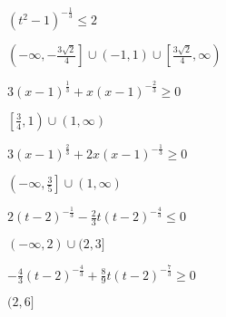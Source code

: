 \documentclass{ximera}
\begin{document}
\begin{question}
$(t^2-1)^{-\frac{1}{3}} \leq 2$  %

\begin{solution}
$\left(-\infty, -\frac{3\sqrt{2}}{4} \right] \cup (-1,1) \cup \left[ \frac{3\sqrt{2}}{4}, \infty \right)$

\end{solution}

\end{question}

\begin{question}
$3(x-1)^{\frac{1}{3}} +x (x-1)^{-\frac{2}{3}} \geq 0$ %
\begin{solution}
$\left[ \frac{3}{4}, 1\right) \cup (1, \infty)$
\end{solution}

\end{question}

\begin{question}
$3(x-1)^{\frac{2}{3}} +2x (x-1)^{-\frac{1}{3}} \geq 0$ %

\begin{solution}
$\left( -\infty, \frac{3}{5} \right] \cup (1, \infty)$

\end{solution}

\end{question}

\begin{question}
$2 (t-2)^{-\frac{1}{3}} -\frac{2}{3} t(t-2)^{-\frac{4}{3}} \leq 0$ 
\begin{solution}
$(-\infty, 2) \cup (2,3]$
\end{solution}

\end{question}

\begin{question}
$-\frac{4}{3} (t-2)^{-\frac{4}{3}} + \frac{8}{9} t (t-2)^{-\frac{7}{3}} \geq 0$

\begin{solution}
$(2,6]$

\end{solution}

\end{question}
\end{document}
